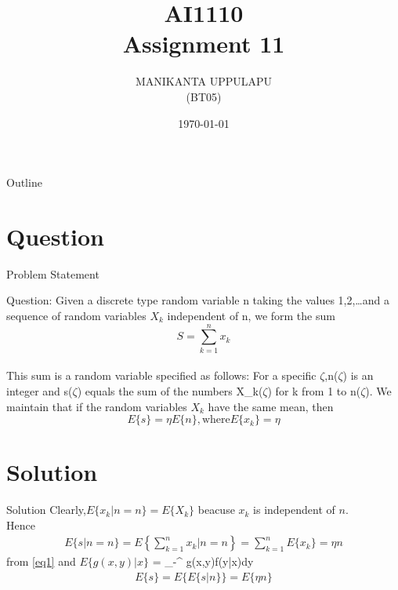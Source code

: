 \documentclass{beamer}
\title{AI1110 \\ Assignment 11}
\author{MANIKANTA UPPULAPU \\ (BT05)}
\date{\today}
\providecommand{\cbrak}[1]{\ensuremath{\left\{#1\right\}}}
\begin{document}
	\begin{frame}
		\titlepage
	\end{frame}
	\begin{frame}{Outline}
		\tableofcontents
	\end{frame}
	\section{Question}
	\begin{frame}{Problem Statement}
	\begin{block}
{Question:}	 Given a discrete type random variable n taking the values 1,2,\dots and a sequence of random variables $X_k$ independent  of  n, we form the sum \\
$$ S = \sum_{k=1}^{n} x_k$$\\
This sum is a random variable specified as follows: For a specific $\zeta$,n($\zeta$) is an integer and s($\zeta$) equals the sum of the numbers X_k($\zeta$) for k from 1 to n($\zeta$). We maintain that if the random variables $X_k$ have the same mean, then
$$E\{s\}=\eta E\{n\} , \text{where} E\{x_k\} = \eta$$

\end{block}
\end{frame}
	\section{Solution}
	\begin{frame}{Solution}
Clearly,$E\{x_k|n=n\} = E\{X_k\}$ beacuse $x_k$ is independent of $n$.\\
Hence\\
\begin{align}
E\{s|n=n\} = E\cbrak{\sum_{k=1}^{n}x_k|n=n} = \sum_{k=1}^{n}E\{x_k\}=\eta n\label{eq1}
\end{align}
from \eqref{eq1} and $E\{g(x,y)|x\}$ = \int_{-\infty}^{\infty} g(x,y)f(y|x)dy\\
\begin{align}
E\{s\} = E\{E\{s|n\}\} = E \{\eta n\}
\end{align}
\end{frame}
\end{document}
